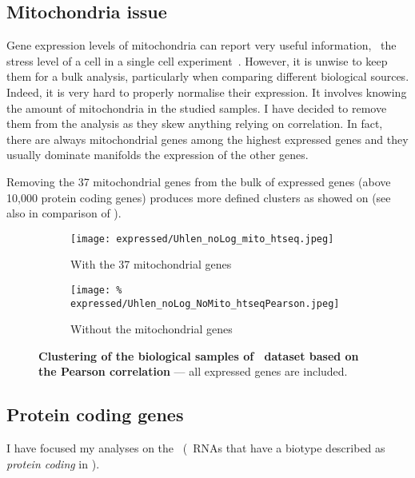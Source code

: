 \subsection{Mitochondria issue}\label{subsec:mito}

Gene expression levels of mitochondria can report very useful information,
\eg\ the stress level of a cell in a single cell experiment~.
However, it is unwise to keep them for a bulk analysis, particularly when
comparing different biological sources.
Indeed, it is very hard to properly normalise their expression.
It involves knowing the amount of mitochondria in the studied samples.
I have decided to remove them from the analysis as they skew anything relying
on correlation.
In fact, there are always mitochondrial genes among the highest expressed genes
and they usually dominate manifolds the expression of the other genes.

Removing the 37 mitochondrial genes from the bulk of expressed genes
(above 10,000 protein coding genes) produces more defined clusters as showed on
 (see also  in comparison
of ).

\begin{figure}
    \centering
    \begin{subfigure}[b]{0.79\textwidth}
        \centering
        \texttt{[image: expressed/Uhlen\_noLog\_mito\_htseq.jpeg]}
        \caption{With the 37 mitochondrial genes}\label{fig:withMito}
    \end{subfigure}

    \begin{subfigure}[b]{0.79\textwidth}
        \centering
        \texttt{[image: \%
            expressed/Uhlen\_noLog\_NoMito\_htseqPearson.jpeg]}
        \caption{Without the mitochondrial genes}\label{fig:NoMito}
    \end{subfigure}
    \caption[Clustering of the biological samples of \uhlen\
    dataset based on the Pearson correlation]{\label{fig:MitoNomito}\textbf{Clustering
    of the biological samples of \uhlen\ dataset based on the Pearson correlation}
    --- all expressed genes are included.}
\end{figure}


\subsection{Protein coding genes}\label{subsec:protcodingOnly}
I have focused my analyses on the \mRNAs\ (\ie\ \glspl{RNA} that have a
biotype described as \emph{protein coding} in \ens{76}).

